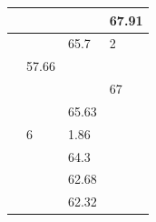 \begin{tabular}{llll}
\toprule
 &  &  & 67.91 \\
\midrule
 &  & 65.7 & 2 \\
 & 57.66 &  &  \\
 &  &  & 67 \\
 &  & 65.63 &  \\
 & 6 & 1.86 &  \\
 &  & 64.3 &  \\
 &  & 62.68 &  \\
 &  & 62.32 &  \\
\bottomrule
\end{tabular}
